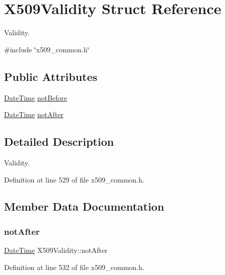 \hypertarget{structX509Validity}{}\section{X509\+Validity Struct Reference}
\label{structX509Validity}


Validity.  




{\ttfamily \#include \char`\"{}x509\+\_\+common.\+h\char`\"{}}

\subsection*{Public Attributes}
\begin{DoxyCompactItemize}
\item 
\hyperlink{structDateTime}{Date\+Time} \hyperlink{structX509Validity_a54d94f88fced1072aaacb4824757aee0}{not\+Before}
\item 
\hyperlink{structDateTime}{Date\+Time} \hyperlink{structX509Validity_a23debc3797b2921431fce9658ecc1b73}{not\+After}
\end{DoxyCompactItemize}


\subsection{Detailed Description}
Validity. 

Definition at line 529 of file x509\+\_\+common.\+h.



\subsection{Member Data Documentation}
\mbox{\label{structX509Validity_a23debc3797b2921431fce9658ecc1b73}} 
\subsubsection{\texorpdfstring{not\+After}{notAfter}}
{\footnotesize\ttfamily \hyperlink{structDateTime}{Date\+Time} X509\+Validity\+::not\+After}



Definition at line 532 of file x509\+\_\+common.\+h.

\mbox{\label{structX509Validity_a54d94f88fced1072aaacb4824757aee0}} 
